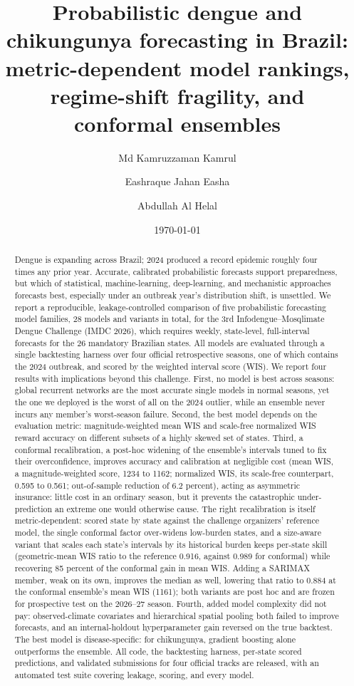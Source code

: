 \documentclass[11pt]{article}
\title{\textbf{Probabilistic dengue and chikungunya forecasting in Brazil:\\
metric-dependent model rankings, regime-shift fragility, and conformal ensembles}}
\author[1]{Md Kamruzzaman Kamrul}
\author[2]{Eashraque Jahan Easha}
\author[3]{Abdullah Al Helal}
\affil[1]{Purdue University, West Lafayette, IN, USA}
\affil[2]{University of Denver, Denver, CO, USA}
\affil[3]{Oklahoma State University, Stillwater, OK, USA}
\date{\today}
\begin{document}
\maketitle

\begin{abstract}
\noindent
Dengue is expanding across Brazil; 2024 produced a record epidemic roughly four times any prior
year. Accurate, calibrated probabilistic forecasts support preparedness, but which of statistical,
machine-learning, deep-learning, and mechanistic approaches forecasts best, especially under an
outbreak year's distribution shift, is unsettled. We report a reproducible, leakage-controlled
comparison of five probabilistic forecasting model families, 28 models and variants in total, for the 3rd Infodengue--Mosqlimate
Dengue Challenge (IMDC 2026), which requires weekly, state-level, full-interval forecasts for the
26 mandatory Brazilian states. All models are evaluated through a single backtesting harness over
four official retrospective seasons, one of which contains the 2024 outbreak, and scored by the
weighted interval score (WIS). We report four results with implications beyond this challenge.
First, no model is best across seasons: global recurrent networks are the most accurate single
models in normal seasons, yet the one we deployed is the worst of all on the 2024 outlier, while an
ensemble never incurs any member's worst-season failure. Second, the best model depends on the evaluation metric: magnitude-weighted mean WIS and
scale-free normalized WIS reward accuracy on different subsets of a highly skewed set of states.
Third, a conformal recalibration, a post-hoc widening of the ensemble's intervals tuned to fix
their overconfidence, improves accuracy and calibration at negligible cost (mean WIS, a
magnitude-weighted score, 1234 to 1162; normalized WIS, its scale-free counterpart, 0.595 to
0.561; out-of-sample reduction of 6.2 percent), acting as asymmetric insurance: little cost in an
ordinary season, but it prevents the catastrophic under-prediction an extreme one would otherwise
cause. The right recalibration is itself metric-dependent: scored state by state against the
challenge organizers' reference model, the single conformal factor over-widens low-burden states,
and a size-aware variant that scales each state's intervals by its historical burden keeps per-state
skill (geometric-mean WIS ratio to the reference 0.916, against 0.989 for conformal) while
recovering 85 percent of the conformal gain in mean WIS. Adding a SARIMAX member, weak on its own,
improves the median as well, lowering that ratio to 0.884 at the conformal ensemble's mean WIS
(1161); both variants are post hoc and are frozen for prospective test on the 2026--27 season.
Fourth, added model complexity did not pay: observed-climate covariates and hierarchical
spatial pooling both failed to improve forecasts, and an internal-holdout hyperparameter gain
reversed on the true backtest. The best model is disease-specific: for chikungunya, gradient
boosting alone outperforms the ensemble. All code, the backtesting harness, per-state scored
predictions, and validated submissions for four official tracks are released, with an automated
test suite covering leakage, scoring, and every model.
\end{abstract}
\end{document}
